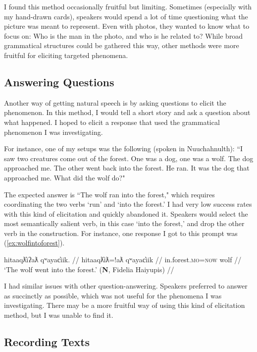I found this method occasionally fruitful but limiting. Sometimes (especially with my hand-drawn cards), speakers would spend a lot of time questioning what the picture was meant to represent. Even with photos, they wanted to know what to focus on: Who is the man in the photo, and who is he related to? While broad grammatical structures could be gathered this way, other methods were more fruitful for eliciting targeted phenomena.

\subsection{Answering Questions}

Another way of getting natural speech is by asking questions to elicit the phenomenon. In this method, I would tell a short story and ask a question about what happened. I hoped to elicit a response that used the grammatical phenomenon I was investigating.

For instance, one of my setups was the following (spoken in Nuuchahnulth): ``I saw two creatures come out of the forest. One was a dog, one was a wolf. The dog approached me. The other went back into the forest. He ran. It was the dog that approached me. What did the wolf do?"

The expected answer is ``The wolf ran into the forest," which requires coordinating the two verbs `run' and `into the forest.' I had very low success rates with this kind of elicitation and quickly abandoned it. Speakers would select the most semantically salient verb, in this case `into the forest,' and drop the other verb in the construction. For instance, one response I got to this prompt was (\ref{ex:wolfintoforest}).

\ex \label{ex:wolfintoforest}
\begingl
\glpreamble hitaaqƛ̓iʔaƛ qʷayac̓iik. //
\gla hitaaqƛ̓iƛ=!aƛ qʷayac̓iik //
\glb in.forest.\textsc{mo}=\textsc{now} wolf //
\glft `The wolf went into the forest.' (\textbf{N}, Fidelia Haiyupis) //
\endgl
\xe

I had similar issues with other question-answering. Speakers preferred to answer as succinctly as possible, which was not useful for the phenomena I was investigating. There may be a more fruitful way of using this kind of elicitation method, but I was unable to find it.

\subsection{Recording Texts}

